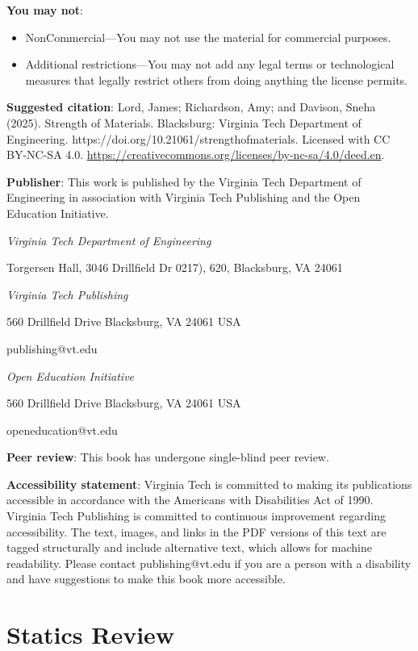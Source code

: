 \documentclass[
  letterpaper,
  DIV=11,
  numbers=noendperiod]{scrreprt}
\theoremstyle{definition}
\theoremstyle{remark}
\begin{document}
\textbf{You may not}:

\begin{itemize}
\item
  NonCommercial---You may not use the material for commercial purposes.
\item
  Additional restrictions---You may not add any legal terms or
  technological measures that legally restrict others from doing
  anything the license permits.
\end{itemize}

\textbf{Suggested citation}: Lord, James; Richardson, Amy; and Davison,
Sneha (2025). Strength of Materials. Blacksburg: Virginia Tech
Department of Engineering. https://doi.org/10.21061/strengthofmaterials.
Licensed with CC BY-NC-SA 4.0.
\url{https://creativecommons.org/licenses/by-nc-sa/4.0/deed.en}.

\textbf{Publisher}: This work is published by the Virginia Tech
Department of Engineering in association with Virginia Tech Publishing
and the Open Education Initiative.

\emph{Virginia Tech Department of Engineering}

Torgersen Hall, 3046 Drillfield Dr 0217), 620, Blacksburg, VA 24061

\emph{Virginia Tech Publishing}

560 Drillfield Drive Blacksburg, VA 24061 USA

publishing@vt.edu

\emph{Open Education Initiative}

560 Drillfield Drive Blacksburg, VA 24061 USA

openeducation@vt.edu

\textbf{Peer review}: This book has undergone single-blind peer review.

\textbf{Accessibility statement}: Virginia Tech is committed to making
its publications accessible in accordance with the Americans with
Disabilities Act of 1990. Virginia Tech Publishing is committed to
continuous improvement regarding accessibility. The text, images, and
links in the PDF versions of this text are tagged structurally and
include alternative text, which allows for machine readability. Please
contact publishing@vt.edu if you are a person with a disability and have
suggestions to make this book more accessible.


\chapter{Statics Review}\label{sec-statics}
\end{document}
